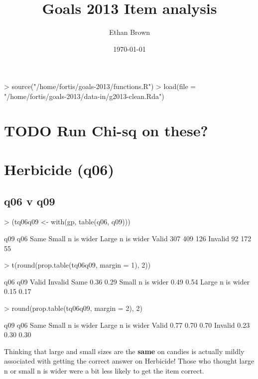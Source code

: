 \documentclass[11pt]{article}
\author{Ethan Brown}
\date{\today}
\title{Goals 2013 Item analysis}
\begin{document}
\maketitle
\begin{Schunk}
\begin{Sinput}
> source("/home/fortis/goals-2013/functions.R")
> load(file = "/home/fortis/goals-2013/data-in/g2013-clean.Rda")
\end{Sinput}
\end{Schunk}

\section{{\bfseries\sffamily TODO} Run Chi-sq on these?}
\label{sec-1}
\section{Herbicide (q06)}
\label{sec-2}
\subsection{q06 v q09}
\label{sec-2-1}
\begin{Schunk}
\begin{Sinput}
> (tq06q09 <- with(gp, table(q06, q09)))
\end{Sinput}
\begin{Soutput}
         q09
q06       Same Small n is wider Large n is wider
  Valid    307              409              126
  Invalid   92              172               55
\end{Soutput}
\begin{Sinput}
> t(round(prop.table(tq06q09, margin = 1), 2))
\end{Sinput}
\begin{Soutput}
                  q06
q09                Valid Invalid
  Same              0.36    0.29
  Small n is wider  0.49    0.54
  Large n is wider  0.15    0.17
\end{Soutput}
\begin{Sinput}
> round(prop.table(tq06q09, margin = 2), 2)
\end{Sinput}
\begin{Soutput}
         q09
q06       Same Small n is wider Large n is wider
  Valid   0.77             0.70             0.70
  Invalid 0.23             0.30             0.30
\end{Soutput}
\end{Schunk}

Thinking that large and small sizes are the \textbf{same} on candies is actually mildly associated with getting the correct answer on Herbicide!  Those who thought large n or small n is wider were a bit less likely to get the item correct.
\end{document}
